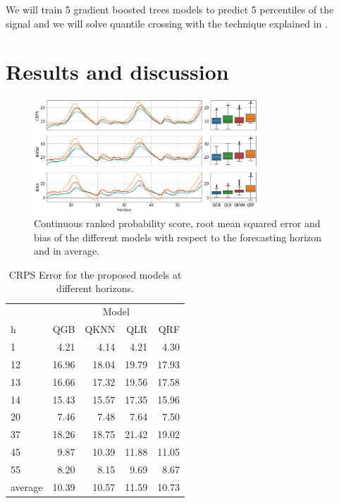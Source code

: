 \documentclass[a4paper,3p,sort&compress]{elsarticle}
\begin{document}
We will train 5 gradient boosted trees models to predict 5 percentiles
of the \no signal and we will solve quantile 
crossing with the technique
explained in \cite{cross}.

\section{Results and discussion}
\label{sec:results}

\begin{figure}[tbp]
  \centering
  \includegraphics[width=0.75\textwidth]{error_graph}
  \caption{\label{figure:errorGraph}
    Continuous ranked probability score, root mean squared
    error and bias of the different models with respect to the
    forecasting horizon and in average.
  }
\end{figure}

\begin{table}[tbp]
  \centering \footnotesize
  \caption{\label{tab:determ}CRPS Error for the proposed models at different
    horizons.}
  \begin{tabular}{lrrrr}
    \toprule
    & \multicolumn{4}{c}{Model} \\ \cmidrule{2-5} 
    h &    QGB &  QKNN &   QLR &   QRF \\
    \midrule
    1     &  4.21 &   4.14 &  4.21 &  4.30 \\
12    & 16.96 &  18.04 & 19.79 & 17.93 \\
13    & 16.66 &  17.32 & 19.56 & 17.58 \\
14    & 15.43 &  15.57 & 17.35 & 15.96 \\
20    &  7.46 &   7.48 &  7.64 &  7.50 \\
37    & 18.26 &  18.75 & 21.42 & 19.02 \\
45    &  9.87 &  10.39 & 11.88 & 11.05 \\
55    &  8.20 &   8.15 &  9.69 &  8.67 \\

    \midrule
    average & 10.39 &  10.57 & 11.59 & 10.73 \\
    \bottomrule
  \end{tabular}
\end{table}
\end{document}
